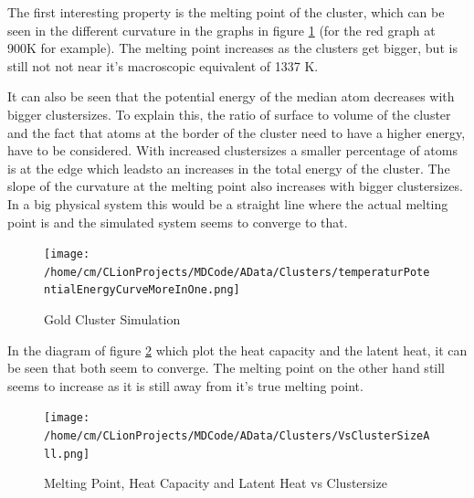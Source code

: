 \par 
The first interesting property is the melting point of the cluster, which can be seen in the different curvature in the graphs in figure \ref{GoldClusterSimulationTemperaturEnergy4In1} (for the red graph at 900K for example). The melting point increases as the clusters get bigger, but is still not not near it's macroscopic equivalent of 1337 K. 

\par
It can also be seen that the potential energy of the median atom decreases with bigger clustersizes. To explain this, the ratio of surface to volume of the cluster and the fact that atoms at the border of the cluster need to have a higher energy, have to be considered. With increased clustersizes a smaller percentage of atoms is at the edge which leadsto an increases in the total energy of the cluster. 
The slope of the curvature at the melting point also increases with bigger clustersizes. In a big physical system this would be a straight line where the actual melting point is and the simulated system seems to converge to that. 

\begin{figure}
	\begin{center} 
		\texttt{[image: /home/cm/CLionProjects/MDCode/AData/Clusters/temperaturPotentialEnergyCurveMoreInOne.png]} 
	\end{center} 
	\caption[Gold Cluster Simulation]{Gold Cluster Simulation} 
	\label{GoldClusterSimulationTemperaturEnergy4In1} 
\end{figure} 

In the diagram of figure \ref{GoldClusterSimulationVsClustersize} which plot the heat capacity and the latent heat, it can be seen that both seem to converge. The melting point on the other hand still seems to increase as it is still away from it's true melting point.

\begin{figure}
	\begin{center} 
		\texttt{[image: /home/cm/CLionProjects/MDCode/AData/Clusters/VsClusterSizeAll.png]} 
	\end{center} 
	\caption[Melting Point, Heat Capacity and Latent Heat vs Clustersize]{Melting Point, Heat Capacity and Latent Heat vs Clustersize} 
	\label{GoldClusterSimulationVsClustersize} 
\end{figure} 
